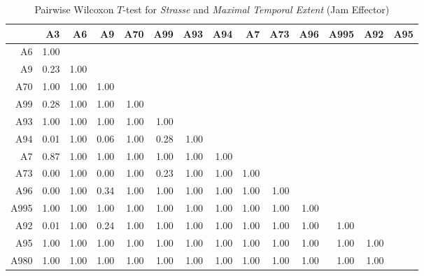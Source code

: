 \begin{table}[ht]
	\tiny
	\centering
	\begin{tabular}{rrrrrrrrrrrrrr}
		\toprule
		     & A3 & A6 & A9 & A70 & A99 & A93 & A94 & A7 & A73 & A96 & A995 & A92 & A95 \\ 
		\midrule
		A6   & 1.00 &  &  &  &  &  &  &  &  &  &  &  &  \\ 
		A9   & 0.23 & 1.00 &  &  &  &  &  &  &  &  &  &  &  \\ 
		A70  & 1.00 & 1.00 & 1.00 &  &  &  &  &  &  &  &  &  &  \\ 
		A99  & 0.28 & 1.00 & 1.00 & 1.00 &  &  &  &  &  &  &  &  &  \\ 
		A93  & 1.00 & 1.00 & 1.00 & 1.00 & 1.00 &  &  &  &  &  &  &  &  \\ 
		A94  & 0.01 & 1.00 & 0.06 & 1.00 & 0.28 & 1.00 &  &  &  &  &  &  &  \\ 
		A7   & 0.87 & 1.00 & 1.00 & 1.00 & 1.00 & 1.00 & 1.00 &  &  &  &  &  &  \\ 
		A73  & 0.00 & 1.00 & 0.00 & 1.00 & 0.23 & 1.00 & 1.00 & 1.00 &  &  &  &  &  \\ 
		A96  & 0.00 & 1.00 & 0.34 & 1.00 & 1.00 & 1.00 & 1.00 & 1.00 & 1.00 &  &  &  &  \\ 
		A995 & 1.00 & 1.00 & 1.00 & 1.00 & 1.00 & 1.00 & 1.00 & 1.00 & 1.00 & 1.00 &  &  &  \\ 
		A92  & 0.01 & 1.00 & 0.24 & 1.00 & 1.00 & 1.00 & 1.00 & 1.00 & 1.00 & 1.00 & 1.00 &  &  \\ 
		A95  & 1.00 & 1.00 & 1.00 & 1.00 & 1.00 & 1.00 & 1.00 & 1.00 & 1.00 & 1.00 & 1.00 & 1.00 &  \\ 
		A980 & 1.00 & 1.00 & 1.00 & 1.00 & 1.00 & 1.00 & 1.00 & 1.00 & 1.00 & 1.00 & 1.00 & 1.00 &  \\ 
		\bottomrule
	  \end{tabular}
    \caption{Pairwise Wilcoxon $T$-test for \textit{Strasse} and \textit{Maximal Temporal Extent} (Jam Effector)}
    \label{tbl:wilcoxon_baysis_effector_Strasse_TMax}
\end{table}
